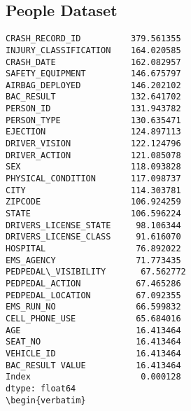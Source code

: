 \documentclass[12pt]{article}
\begin{document}
\subsection{People Dataset}
{\scriptsize
\begin{verbatim}
CRASH_RECORD_ID          379.561355
INJURY_CLASSIFICATION    164.020585
CRASH_DATE               162.082957
SAFETY_EQUIPMENT         146.675797
AIRBAG_DEPLOYED          146.202102
BAC_RESULT               132.641702
PERSON_ID                131.943782
PERSON_TYPE              130.635471
EJECTION                 124.897113
DRIVER_VISION            122.124796
DRIVER_ACTION            121.085078
SEX                      118.093828
PHYSICAL_CONDITION       117.098737
CITY                     114.303781
ZIPCODE                  106.924259
STATE                    106.596224
DRIVERS_LICENSE_STATE     98.106344
DRIVERS_LICENSE_CLASS     91.616070
HOSPITAL                  76.892022
EMS_AGENCY                71.773435
PEDPEDAL\_VISIBILITY       67.562772
PEDPEDAL_ACTION           67.465286
PEDPEDAL_LOCATION         67.092355
EMS_RUN_NO                66.599832
CELL_PHONE_USE            65.684016
AGE                       16.413464
SEAT_NO                   16.413464
VEHICLE_ID                16.413464
BAC_RESULT VALUE          16.413464
Index                      0.000128
dtype: float64
\begin{verbatim}
\end{verbatim}}
\end{document}

